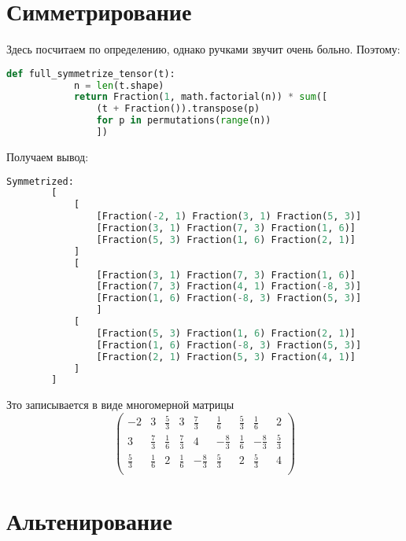 \documentclass[12pt, a4paper]{article}
\newcommand\arr[2]{\left(\begin{array}{#1}#2\end{array}\right)}
\begin{document}
    \section{Симметрирование}

    Здесь посчитаем по определению, однако ручками звучит очень больно. Поэтому:

    \begin{lstlisting}[language=Python]
        def full_symmetrize_tensor(t):
        	n = len(t.shape)
	        return Fraction(1, math.factorial(n)) * sum([
                (t + Fraction()).transpose(p) 
                for p in permutations(range(n))
                ])
    \end{lstlisting}

    Получаем вывод:

    \begin{lstlisting}[language=Python]
        Symmetrized:
        [
            [
                [Fraction(-2, 1) Fraction(3, 1) Fraction(5, 3)]
                [Fraction(3, 1) Fraction(7, 3) Fraction(1, 6)]
                [Fraction(5, 3) Fraction(1, 6) Fraction(2, 1)]
            ]
            [
                [Fraction(3, 1) Fraction(7, 3) Fraction(1, 6)]
                [Fraction(7, 3) Fraction(4, 1) Fraction(-8, 3)]
                [Fraction(1, 6) Fraction(-8, 3) Fraction(5, 3)]
                ]
            [
                [Fraction(5, 3) Fraction(1, 6) Fraction(2, 1)]
                [Fraction(1, 6) Fraction(-8, 3) Fraction(5, 3)]
                [Fraction(2, 1) Fraction(5, 3) Fraction(4, 1)]
            ]
        ]
    \end{lstlisting}

    Зто записывается в виде многомерной матрицы
    \begin{equation}
        \arr{ccc|ccc|ccc}{
            -2 & 3 & \frac{5}{3}           & 3 & \frac73 & \frac16              & \frac53 & \frac16 & 2 \\
            3 & \frac{7}{3} & \frac{1}{6}  & \frac73  & 4 & -\frac83            & \frac16 & -\frac83 & \frac53 \\
            \frac{5}{3} & \frac{1}{6} & 2  &  \frac16 & -\frac83 & \frac53      & 2 & \frac53 & 4 \\
        }
    \end{equation}


    \section{Альтенирование}
\end{document}
